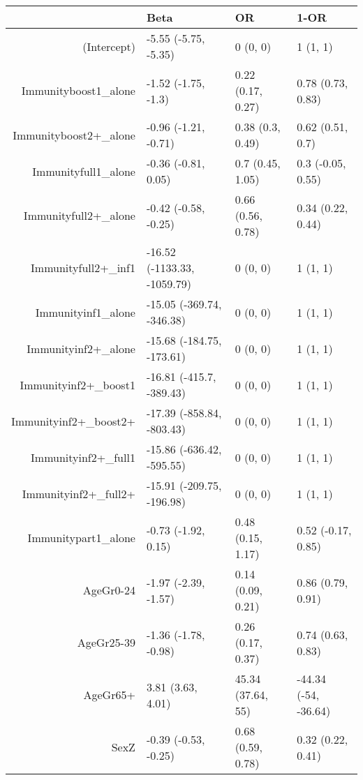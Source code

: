 \begin{table}[ht]
\centering
\begin{tabular}{rlll}
  \hline
 & Beta & OR & 1-OR \\ 
  \hline
(Intercept) & -5.55 (-5.75, -5.35) & 0 (0, 0) & 1 (1, 1) \\ 
  Immunityboost1\_alone & -1.52 (-1.75, -1.3) & 0.22 (0.17, 0.27) & 0.78 (0.73, 0.83) \\ 
  Immunityboost2+\_alone & -0.96 (-1.21, -0.71) & 0.38 (0.3, 0.49) & 0.62 (0.51, 0.7) \\ 
  Immunityfull1\_alone & -0.36 (-0.81, 0.05) & 0.7 (0.45, 1.05) & 0.3 (-0.05, 0.55) \\ 
  Immunityfull2+\_alone & -0.42 (-0.58, -0.25) & 0.66 (0.56, 0.78) & 0.34 (0.22, 0.44) \\ 
  Immunityfull2+\_inf1 & -16.52 (-1133.33, -1059.79) & 0 (0, 0) & 1 (1, 1) \\ 
  Immunityinf1\_alone & -15.05 (-369.74, -346.38) & 0 (0, 0) & 1 (1, 1) \\ 
  Immunityinf2+\_alone & -15.68 (-184.75, -173.61) & 0 (0, 0) & 1 (1, 1) \\ 
  Immunityinf2+\_boost1 & -16.81 (-415.7, -389.43) & 0 (0, 0) & 1 (1, 1) \\ 
  Immunityinf2+\_boost2+ & -17.39 (-858.84, -803.43) & 0 (0, 0) & 1 (1, 1) \\ 
  Immunityinf2+\_full1 & -15.86 (-636.42, -595.55) & 0 (0, 0) & 1 (1, 1) \\ 
  Immunityinf2+\_full2+ & -15.91 (-209.75, -196.98) & 0 (0, 0) & 1 (1, 1) \\ 
  Immunitypart1\_alone & -0.73 (-1.92, 0.15) & 0.48 (0.15, 1.17) & 0.52 (-0.17, 0.85) \\ 
  AgeGr0-24 & -1.97 (-2.39, -1.57) & 0.14 (0.09, 0.21) & 0.86 (0.79, 0.91) \\ 
  AgeGr25-39 & -1.36 (-1.78, -0.98) & 0.26 (0.17, 0.37) & 0.74 (0.63, 0.83) \\ 
  AgeGr65+ & 3.81 (3.63, 4.01) & 45.34 (37.64, 55) & -44.34 (-54, -36.64) \\ 
  SexZ & -0.39 (-0.53, -0.25) & 0.68 (0.59, 0.78) & 0.32 (0.22, 0.41) \\ 
   \hline
\end{tabular}
\end{table}
